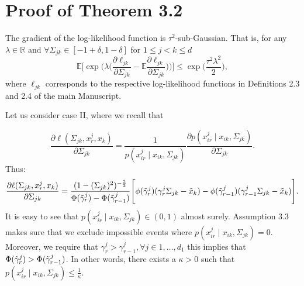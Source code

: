 \section{Proof of Theorem 3.2
}\label{proof_convergence}


\begin{condition}\label{Gradient statistical noise}
    The gradient of the log-likelihood function is $\tau^2$-sub-Gaussian. That is, for any $\lambda \in \mathbb{R}$ and $\forall \Sigma_{jk} \in [-1+\delta, 1-\delta]$ for $1\leq j < k \leq d$
    \begin{equation}
        \mathbb{E}\Bigg[\exp\Bigg(\lambda \Big(\frac{\partial\ell_{jk}}{\partial \Sigma_{jk}} - \mathbb{E}\frac{\partial\ell_{jk}}{\partial \Sigma_{jk}} \Big) \Bigg)\Bigg] \leq \exp\Big(\frac{\tau^2\lambda^2}{2}\Big),
    \end{equation}
    where $\ell_{jk}$ corresponds to the respective log-likelihood functions in Definitions 2.3 and 2.4 of the main Manuscript. 
    
    Let us consider case II, where we recall that 

    \begin{equation*}
        \frac{\partial\ell(\Sigma_{jk}, x^j_r,x_k)}{\partial \Sigma_{jk}} = \frac{1}{p(x^j_{ir} \mid x_{ik}, \Sigma_{jk})} \frac{\partial p(x^j_{ir} \mid x_{ik}, \Sigma_{jk})}{\partial \Sigma_{jk}}.
    \end{equation*}
    Thus:
    \begin{equation*}
        \frac{\partial\ell(\Sigma_{jk}, x^j_r,x_k)}{\partial \Sigma_{jk}} = \frac{(1-(\Sigma_{jk})^2)^{-\frac{3}{2}}}{\Phi({\Tilde{\gamma}}^j_{r}) - \Phi({\Tilde{\gamma}}^j_{r-1})} \Bigg[\phi({\Tilde{\gamma}}^j_{r})({\gamma}^j_r\Sigma_{jk} - {\Tilde{x}}_{k}) - \phi({\Tilde{\gamma}}^j_{r-1})({\gamma}^j_{r-1}\Sigma_{jk} - {\Tilde{x}}_{k})\Bigg].
    \end{equation*}
    It is easy to see that $p(x^j_{ir} \mid x_{ik}, \Sigma_{jk}) \in (0,1)$ almost surely. Assumption 3.3
    makes sure that we exclude impossible events where $p(x^j_{ir} \mid x_{ik}, \Sigma_{jk}) = 0$. Moreover, we require that $\gamma^j_r > \gamma^j_{r-1}, \forall j \in 1, \dots, d_1$ this implies that $\Phi({\Tilde{\gamma}}^j_{r}) > \Phi({\Tilde{\gamma}}^j_{r-1})$. In other words, there exists a $\kappa >0$ such that $p(x^j_{ir} \mid x_{ik}, \Sigma_{jk}) \leq \frac{1}{\kappa}$.
    

\end{condition}
